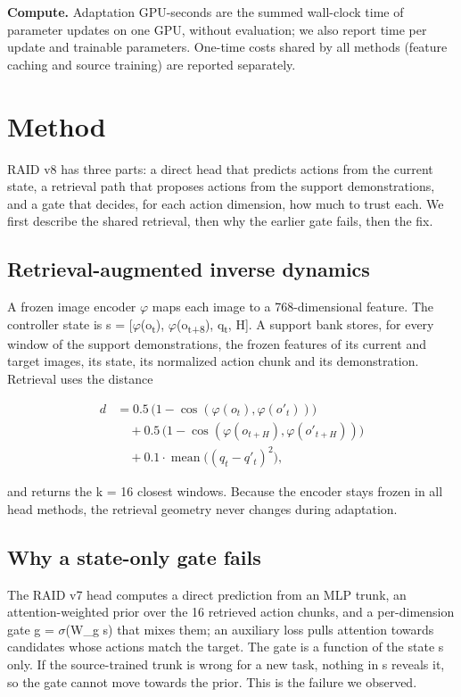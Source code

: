 \documentclass[10pt,twocolumn,letterpaper]{article}
\begin{document}
\textbf{Compute.} Adaptation GPU-seconds are the summed wall-clock time of parameter updates on one GPU, without evaluation; we also report time per update and trainable parameters. One-time costs shared by all methods (feature caching and source training) are reported separately.

\section{Method}

RAID v8 has three parts: a direct head that predicts actions from the current state, a retrieval path that proposes actions from the support demonstrations, and a gate that decides, for each action dimension, how much to trust each. We first describe the shared retrieval, then why the earlier gate fails, then the fix.

\subsection{Retrieval-augmented inverse dynamics}

A frozen image encoder \ensuremath{\varphi} maps each image to a 768-dimensional feature. The controller state is s = {[}\ensuremath{\varphi}(o\textsubscript{t}), \ensuremath{\varphi}(o\textsubscript{t+8}), q\textsubscript{t}, H{]}. A support bank stores, for every window of the support demonstrations, the frozen features of its current and target images, its state, its normalized action chunk and its demonstration. Retrieval uses the distance

\begin{align*}
d &= 0.5\,\bigl(1-\cos(\varphi(o_t),\varphi(o'_t))\bigr)\\
  &\quad + 0.5\,\bigl(1-\cos(\varphi(o_{t+H}),\varphi(o'_{t+H}))\bigr)\\
  &\quad + 0.1\cdot\operatorname{mean}\bigl((q_t-q'_t)^2\bigr),
\end{align*}

and returns the k = 16 closest windows. Because the encoder stays frozen in all head methods, the retrieval geometry never changes during adaptation.

\subsection{Why a state-only gate fails}

The RAID v7 head computes a direct prediction from an MLP trunk, an attention-weighted prior over the 16 retrieved action chunks, and a per-dimension gate g = \ensuremath{\sigma}(W\_g s) that mixes them; an auxiliary loss pulls attention towards candidates whose actions match the target. The gate is a function of the state s only. If the source-trained trunk is wrong for a new task, nothing in s reveals it, so the gate cannot move towards the prior. This is the failure we observed.
\end{document}

